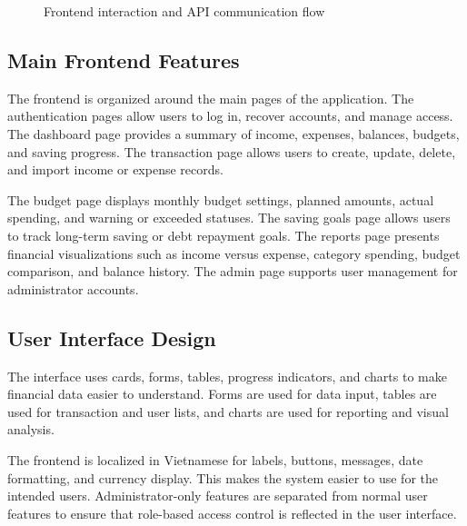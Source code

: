﻿\documentclass{article}
\begin{document}
\begin{figure}[H]
{
}
\caption{Frontend interaction and API communication flow}
\label{fig:frontend-interaction-flow}
\end{figure}

\subsection{Main Frontend Features}

The frontend is organized around the main pages of the application. The authentication pages allow users to log in, recover accounts, and manage access. The dashboard page provides a summary of income, expenses, balances, budgets, and saving progress. The transaction page allows users to create, update, delete, and import income or expense records.

The budget page displays monthly budget settings, planned amounts, actual spending, and warning or exceeded statuses. The saving goals page allows users to track long-term saving or debt repayment goals. The reports page presents financial visualizations such as income versus expense, category spending, budget comparison, and balance history. The admin page supports user management for administrator accounts.

\subsection{User Interface Design}

The interface uses cards, forms, tables, progress indicators, and charts to make financial data easier to understand. Forms are used for data input, tables are used for transaction and user lists, and charts are used for reporting and visual analysis.

The frontend is localized in Vietnamese for labels, buttons, messages, date formatting, and currency display. This makes the system easier to use for the intended users. Administrator-only features are separated from normal user features to ensure that role-based access control is reflected in the user interface.
\end{document}
